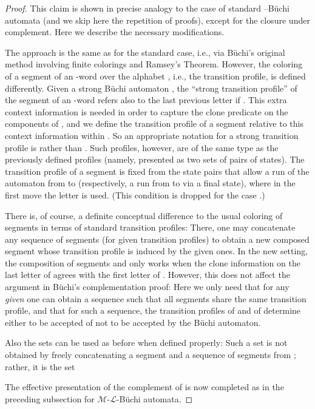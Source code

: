 \documentclass[copyright,creativecommons]{eptcs}
\theoremstyle{plain}
\theoremstyle{nonumberplain}
\newtheorem{proof}{Proof}
\newcommand{\m}{\ensuremath{\mathcal{M}}}
\newcommand{\el}{\ensuremath{\mathcal{L}}}
\newcommand{\ml}{\ensuremath{\m\textrm{-}\el}}
\begin{document}
\begin{proof}
This claim is shown in precise analogy to the case of standard 
--B\"uchi automata (and we skip here the repetition of proofs), 
except for the closure under complement. Here we describe the necessary 
modifications. 

The approach is the same as for the standard case, 
i.e., via B\"uchi's original method involving finite colorings and 
Ramsey's Theorem. However, the coloring of a segment of an 
-word over the alphabet , i.e., the transition profile, is 
defined differently. Given a strong B\"uchi automaton , 
the ``strong transition profile'' 
of the segment  
of an -word  refers also to the 
last previous letter  if . This extra context 
information is needed in order to capture the clone predicate on the 
 components of , and we define the transition profile of a segment 
relative to this context information within . So an appropriate 
notation for a strong transition profile is  rather than 
. Such profiles, however, are of the same type as the previously 
defined profiles (namely, presented as two sets of pairs of states). The
transition profile of a segment  is fixed from the 
state pairs  that allow a run of the automaton from  to  
(respectively, a run from  to  via a final state), where   
in the first move the letter  is used. (This condition 
is dropped for the case .) 

There is, of course, a definite conceptual difference to the usual 
coloring of segments in terms of standard transition profiles: 
There, one may concatenate any sequence of segments (for given transition 
profiles) to obtain a new composed segment whose transition profile 
is induced by the given ones. In the new setting, the composition 
of segments  and  only works when the clone information on 
the last letter of  agrees with the first letter of . However, 
this does not affect the argument in B\"uchi's complementation proof: 
Here we only need that for any {\em given}  one can obtain 
a sequence  such that all segments 
 share the same transition profile, 
and that for such a sequence, the transition profiles of 
 and of  determine 
 either to be accepted of not to be accepted by 
the B\"uchi automaton.  

Also the sets  can be used as before
when defined properly:  
Such a set is {not} obtained by freely concatenating 
a segment  and a sequence of segments from ; 
rather, it is the set 

The effective presentation of the complement of  is now completed
as in the preceding subsection for \ml-B\"uchi automata.  
\end{proof}
\end{document}
